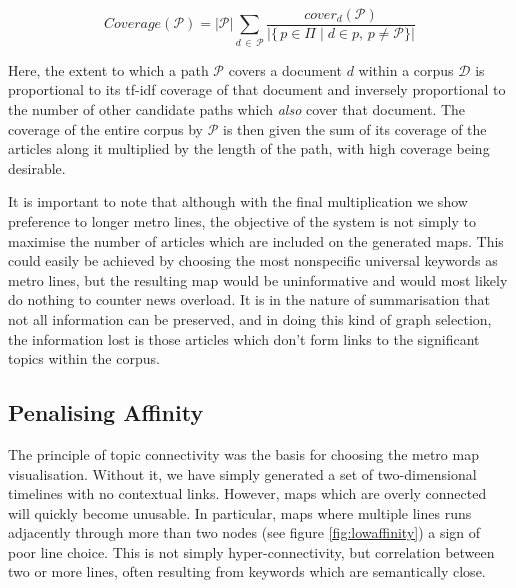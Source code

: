 \begin{equation}
	Coverage(\mathcal{P}) = {|\mathcal{P}|}\sum_{d\,\in\,\mathcal{P}}\frac{cover_{d}(\mathcal{P})}{|\{\,p\in{\Pi}\;|\;d \in p,\,p \neq \mathcal{P}\}|}
	\label{eqn:line-coverage}
\end{equation}

Here, the extent to which a path $\mathcal{P}$ covers a document $d$ within a corpus $\mathcal{D}$ is proportional to its tf-idf coverage of that document and inversely proportional to the number of other candidate paths which \textit{also} cover that document. The coverage of the entire corpus by $\mathcal{P}$ is then given the sum of its coverage of the articles along it multiplied by the length of the path, with high coverage being desirable.

It is important to note that although with the final multiplication we show preference to longer metro lines, the objective of the system is not simply to maximise the number of articles which are included on the generated maps. This could easily be achieved by choosing the most nonspecific universal keywords as metro lines, but the resulting map would be uninformative and would most likely do nothing to counter news overload. It is in the nature of summarisation that not all information can be preserved, and in doing this kind of graph selection, the information lost is those articles which don't form links to the significant topics within the corpus.


\subsection{Penalising Affinity}

The principle of topic connectivity was the basis for choosing the metro map visualisation. Without it, we have simply generated a set of two-dimensional timelines with no contextual links. However, maps which are overly connected will quickly become unusable. In particular, maps where multiple lines runs adjacently through more than two nodes (see figure \ref{fig:lowaffinity}) a sign of poor line choice. This is not simply hyper-connectivity, but correlation between two or more lines, often resulting from keywords which are semantically close.

